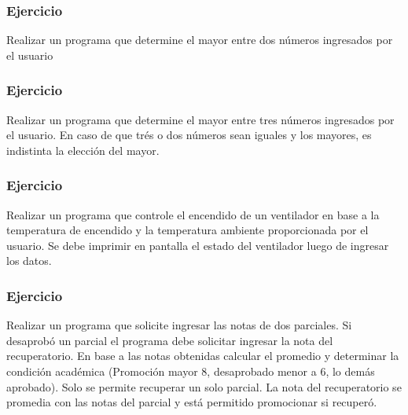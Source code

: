 \lstset{inputencoding=utf8/latin1}

{\small
  \lstset{inputencoding=utf8/latin1}
  
}

\subsubsection{Ejercicio}
Realizar un programa que determine el mayor entre dos números ingresados por el usuario
{\small
  \lstset{inputencoding=utf8/latin1}
  
}

\subsubsection{Ejercicio}
Realizar un programa que determine el mayor entre tres números ingresados por el usuario. En caso de que trés o dos números sean iguales y los mayores, es indistinta la elección del mayor.
{\small
  \lstset{inputencoding=utf8/latin1}
  
}

\subsubsection{Ejercicio}
Realizar un programa que controle el encendido de un ventilador en base a la temperatura de encendido y la temperatura ambiente proporcionada por el usuario. Se debe imprimir en pantalla el estado del ventilador luego de ingresar los datos.
{\small
  \lstset{inputencoding=utf8/latin1}
  
}

\subsubsection{Ejercicio}
Realizar un programa que solicite ingresar las notas de dos parciales. Si desaprobó un parcial el programa debe solicitar ingresar la nota del recuperatorio. En base a las notas obtenidas calcular el promedio y determinar la condición académica (Promoción mayor 8, desaprobado menor a 6, lo demás aprobado). Solo se permite recuperar un solo parcial. La nota del recuperatorio se promedia con las notas del parcial y está permitido promocionar si recuperó.
{\small
  \lstset{inputencoding=utf8/latin1}
  
}

